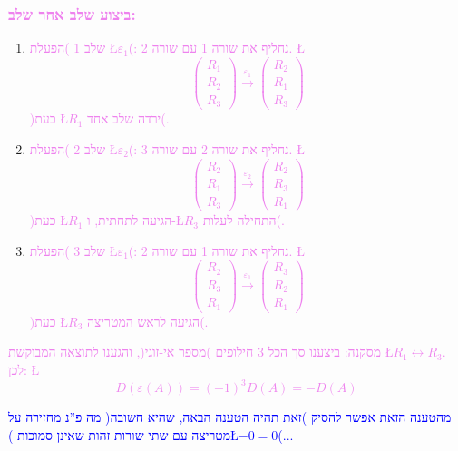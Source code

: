 \documentclass[english,hebrew]{article}
\begin{document}
\subsubsection{\textcolor{violet}{ביצוע שלב אחר שלב:}}
\begin{enumerate}
\item \textcolor{violet}{שלב 1 )הפעלת \L{$\varepsilon_{1}$}(: נחליף את
שורה 1 עם שורה 2. \L{%
\[
\begin{pmatrix}R_{1}\\
R_{2}\\
R_{3}
\end{pmatrix}\xrightarrow{\varepsilon_{1}}\begin{pmatrix}R_{2}\\
R_{1}\\
R_{3}
\end{pmatrix}
\]
}%
)כעת \L{$R_{1}$} ירדה שלב אחד(.}
\item \textcolor{violet}{שלב 2 )הפעלת \L{$\varepsilon_{2}$}(: נחליף את
שורה 2 עם שורה 3. \L{%
\[
\begin{pmatrix}R_{2}\\
R_{1}\\
R_{3}
\end{pmatrix}\xrightarrow{\varepsilon_{2}}\begin{pmatrix}R_{2}\\
R_{3}\\
R_{1}
\end{pmatrix}
\]
}%
)כעת \L{$R_{1}$} הגיעה לתחתית, ו-\L{$R_{3}$} התחילה לעלות(.}
\item \textcolor{violet}{שלב 3 )הפעלת \L{$\varepsilon_{1}$}(: נחליף את
שורה 1 עם שורה 2. \L{%
\[
\begin{pmatrix}R_{2}\\
R_{3}\\
R_{1}
\end{pmatrix}\xrightarrow{\varepsilon_{1}}\begin{pmatrix}R_{3}\\
R_{2}\\
R_{1}
\end{pmatrix}
\]
}%
)כעת \L{$R_{3}$} הגיעה לראש המטריצה(. }
\end{enumerate}
\textcolor{violet}{מסקנה: ביצענו סך הכל 3 חילופים )מספר אי-זוגי(,
והגענו לתוצאה המבוקשת \L{$R_{1}\leftrightarrow R_{3}$}. לכן: \L{%
\[
D(\varepsilon(A))=(-1)^{3}D(A)=-D(A)
\]
}%
}

\textcolor{blue}{מהטענה הזאת אפשר להסיק )זאת תהיה הטענה הבאה, שהיא
חשובה( מה פ\textquotedblright נ מחזירה על מטריצה עם שתי שורות זהות
שאינן סמוכות )\L{$-0=0$}(...}
\end{document}
